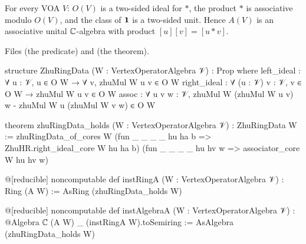 \begin{theorem}\label{l12:thm:zhuring}
For every VOA $V$: $O(V)$ is a two-sided ideal for $*$, the product $*$ is associative modulo $O(V)$, and the
class of $\mathbf{1}$ is a two-sided unit. Hence $A(V)$ is an associative unital ${\mathbb{C}}$-algebra with product
$[u][v] = [u*v]$.
\end{theorem}
\noindent Files  (the predicate) and
 (the theorem).
\begin{leancode}
structure ZhuRingData (W : VertexOperatorAlgebra 𝒱) : Prop where
  left_ideal : ∀ {u : 𝒱}, u ∈ O W → ∀ v, zhuMul W u v ∈ O W
  right_ideal : ∀ (u : 𝒱) {v : 𝒱}, v ∈ O W → zhuMul W u v ∈ O W
  assoc : ∀ u v w : 𝒱, zhuMul W (zhuMul W u v) w - zhuMul W u (zhuMul W v w) ∈ O W

theorem zhuRingData_holds (W : VertexOperatorAlgebra 𝒱) : ZhuRingData W :=
  zhuRingData_of_cores W
    (fun _ _ _ _ hu ha b => ZhuHR.right_ideal_core W hu ha b)
    (fun _ _ _ _ hu hv w => associator_core W hu hv w)

@[reducible] noncomputable def instRingA (W : VertexOperatorAlgebra 𝒱) : Ring (A W) :=
  AsRing (zhuRingData_holds W)

@[reducible] noncomputable def instAlgebraA (W : VertexOperatorAlgebra 𝒱) :
    @Algebra ℂ (A W) _ (instRingA W).toSemiring :=
  AsAlgebra (zhuRingData_holds W)
\end{leancode}

